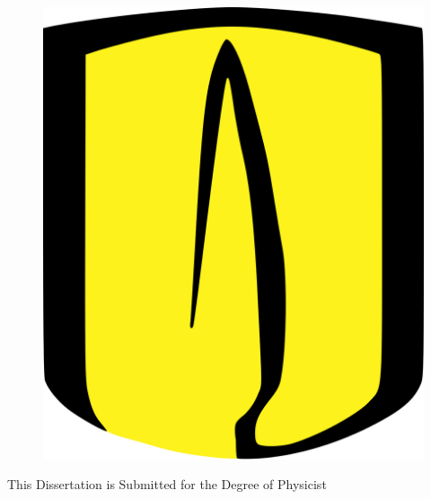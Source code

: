 \makeatletter
\begin{titlepage}

\begin{flushright}
\begin{figure}[h]
\centering
   \includegraphics[scale=0.05]{Template/logo.png}
\end{figure}
\end{flushright}

    \begin{center}
        \vspace*{1cm}

        \Large
        
        \textbf{\@title}

        \vspace{2cm}
        
        \large
        This Dissertation is Submitted for the Degree of Physicist\\  
        
        \vspace{3cm}


\end{center}
\end{titlepage}
